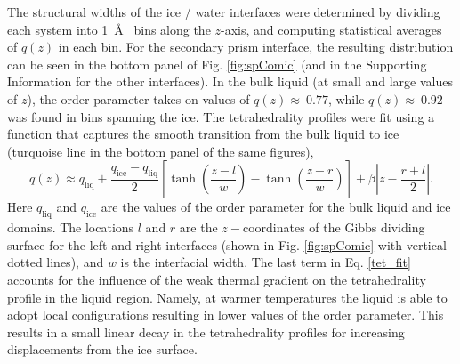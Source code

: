 \documentclass[journal = jpccck, manuscript = article]{achemso}
\begin{document}
The structural widths of the ice / water interfaces were determined by
dividing each system into 1~\AA~ bins along the $z$-axis, and
computing statistical averages of $q(z)$ in each bin. For the
secondary prism interface, the resulting distribution can be seen in
the bottom panel of Fig. \ref{fig:spComic} (and in the Supporting
Information for the other interfaces). In the bulk liquid (at small
and large values of $z$), the order parameter takes on values of
$q(z) \approx~0.77$, while $q(z) \approx~0.92$ was found in bins
spanning the ice. The tetrahedrality profiles were fit using a
function that captures the smooth transition from the bulk liquid to
ice (turquoise line in the bottom panel of the same figures),
\begin{equation}\label{tet_fit}
q(z) \approx
q_\mathrm{liq}+\frac{q_\mathrm{ice}-q_\mathrm{liq}}{2}\left[\tanh\left(\frac{z-l}{w}\right)-\tanh\left(\frac{z-r}{w}\right)\right]+\beta\left|z-\frac{r+l}{2}\right|.
\end{equation}
Here $q_\mathrm{liq}$ and $q_\mathrm{ice}$ are the values of the order
parameter for the bulk liquid and ice domains. The locations $l$ and
$r$ are the $z-$coordinates of the Gibbs dividing surface for the left
and right interfaces (shown in Fig. \ref{fig:spComic} with vertical
dotted lines), and $w$ is the interfacial width.  The last term in
Eq. \eqref{tet_fit} accounts for the influence of the weak thermal
gradient on the tetrahedrality profile in the liquid region. Namely,
at warmer temperatures the liquid is able to adopt local
configurations resulting in lower values of the order parameter. This
results in a small linear decay in the tetrahedrality profiles for
increasing displacements from the ice surface.
\end{document}
